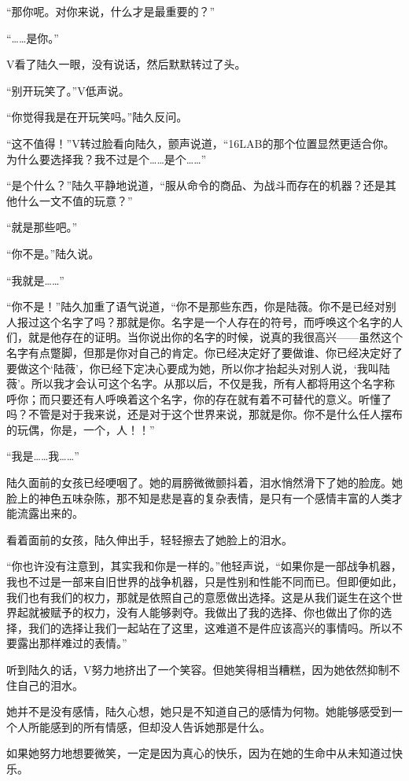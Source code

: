 “那你呢。对你来说，什么才是最重要的？”

“……是你。”

V看了陆久一眼，没有说话，然后默默转过了头。

“别开玩笑了。”V低声说。

“你觉得我是在开玩笑吗。”陆久反问。

“这不值得！”V转过脸看向陆久，颤声说道，“16LAB的那个位置显然更适合你。为什么要选择我？我不过是个……是个……”

“是个什么？”陆久平静地说道，“服从命令的商品、为战斗而存在的机器？还是其他什么一文不值的玩意？”

“就是那些吧。”

“你不是。”陆久说。

“我就是……”

“你不是！”陆久加重了语气说道，“你不是那些东西，你是陆薇。你不是已经对别人报过这个名字了吗？那就是你。名字是一个人存在的符号，而呼唤这个名字的人们，就是他存在的证明。当你说出你的名字的时候，说真的我很高兴——虽然这个名字有点蹩脚，但那是你对自己的肯定。你已经决定好了要做谁、你已经决定好了要做这个‘陆薇’，你已经下定决心要成为她，所以你才抬起头对别人说，‘我叫陆薇’。所以我才会认可这个名字。从那以后，不仅是我，所有人都将用这个名字称呼你；而只要还有人呼唤着这个名字，你的存在就有着不可替代的意义。听懂了吗？不管是对于我来说，还是对于这个世界来说，那就是你。你不是什么任人摆布的玩偶，你是，一个，人！！”

“我是……我……”

陆久面前的女孩已经哽咽了。她的肩膀微微颤抖着，泪水悄然滑下了她的脸庞。她脸上的神色五味杂陈，那不知是悲是喜的复杂表情，是只有一个感情丰富的人类才能流露出来的。

看着面前的女孩，陆久伸出手，轻轻擦去了她脸上的泪水。

“你也许没有注意到，其实我和你是一样的。”他轻声说，“如果你是一部战争机器，我也不过是一部来自旧世界的战争机器，只是性别和性能不同而已。但即便如此，我们也有我们的权力，那就是依照自己的意愿做出选择。这是从我们诞生在这个世界起就被赋予的权力，没有人能够剥夺。我做出了我的选择、你也做出了你的选择，我们的选择让我们一起站在了这里，这难道不是件应该高兴的事情吗。所以不要露出那样难过的表情。”

听到陆久的话，V努力地挤出了一个笑容。但她笑得相当糟糕，因为她依然抑制不住自己的泪水。

她并不是没有感情，陆久心想，她只是不知道自己的感情为何物。她能够感受到一个人所能感到的所有情感，但却没人告诉她那是什么。

如果她努力地想要微笑，一定是因为真心的快乐，因为在她的生命中从未知道过快乐。

